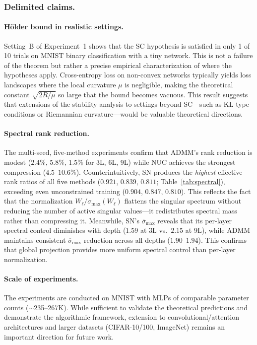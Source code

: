 \documentclass[a4paper,fleqn]{cas-sc}
\theoremstyle{remark}
\theoremstyle{definition}
\begin{document}
\subsubsection{Delimited claims.}

\paragraph{Hölder bound in realistic settings.}
Setting~B of Experiment~1 shows that the SC hypothesis is satisfied in only 1 of 10 trials on MNIST binary classification with a tiny network. This is not a failure of the theorem but rather a precise empirical characterization of where the hypotheses apply. Cross-entropy loss on non-convex networks typically yields loss landscapes where the local curvature $\mu$ is negligible, making the theoretical constant $\sqrt{2R/\mu}$ so large that the bound becomes vacuous. This result suggests that extensions of the stability analysis to settings beyond SC---such as KL-type conditions or Riemannian curvature---would be valuable theoretical directions.

\paragraph{Spectral rank reduction.}
The multi-seed, five-method experiments confirm that ADMM's rank reduction is modest ($2.4\%$, $5.8\%$, $1.5\%$ for 3L, 6L, 9L) while NUC achieves the strongest compression ($4.5$--$10.6\%$). Counterintuitively, SN produces the \emph{highest} effective rank ratios of all five methods ($0.921$, $0.839$, $0.811$; Table~\ref{tab:spectral}), exceeding even unconstrained training ($0.904$, $0.847$, $0.810$). This reflects the fact that the normalization $W_\ell/\sigma_{\max}(W_\ell)$ flattens the singular spectrum without reducing the number of active singular values—it redistributes spectral mass rather than compressing it. Meanwhile, SN's $\overline{\sigma}_{\max}$ reveals that its per-layer spectral control diminishes with depth ($1.59$ at 3L vs.\ $2.15$ at 9L), while ADMM maintains consistent $\overline{\sigma}_{\max}$ reduction across all depths ($1.90$--$1.94$). This confirms that global projection provides more uniform spectral control than per-layer normalization.

\paragraph{Scale of experiments.}
The experiments are conducted on MNIST with MLPs of comparable parameter counts ($\sim$235--267K). While sufficient to validate the theoretical predictions and demonstrate the algorithmic framework, extension to convolutional/attention architectures and larger datasets (CIFAR-10/100, ImageNet) remains an important direction for future work.
\end{document}
